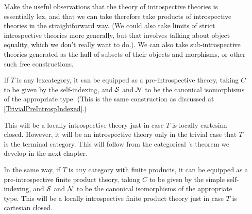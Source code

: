 \begin{TODOblock}
Make the useful observations that the theory of introspective theories is essentially lex, and that we can take therefore take products of introspective theories in the straightforward way. (We could also take limits of strict introspective theories more generally, but that involves talking about object equality, which we don't really want to do.). We can also take sub-introspective theories generated as the hull of subsets of their objects and morphisms, or other such free constructions.
\end{TODOblock}

\begin{construction}\label{TrivialPreIntrosp}
If $T$ is any lexcategory, it can be equipped as a pre-introspective theory, taking $C$ to be given by the self-indexing, and $\mathcal{S}$ and $\mathcal{N}$ to be the canonical isomorphisms of the appropriate type. (This is the same construction as discussed at \cref{TrivialPreIntrospIndexed}.)

This will be a locally introspective theory just in case $T$ is locally cartesian closed. However, it will be an introspective theory only in the trivial case that $T$ is the terminal category. This will follow from the categorical \Loeb's theorem we develop in the next chapter.

In the same way, if $T$ is any category with finite products, it can be equipped as a pre-introspective finite product theory, taking $C$ to be given by the simple self-indexing, and $\mathcal{S}$ and $\mathcal{N}$ to be the canonical isomorphisms of the appropriate type. This will be a locally introspective finite product theory just in case $T$ is cartesian closed.

\end{construction}


